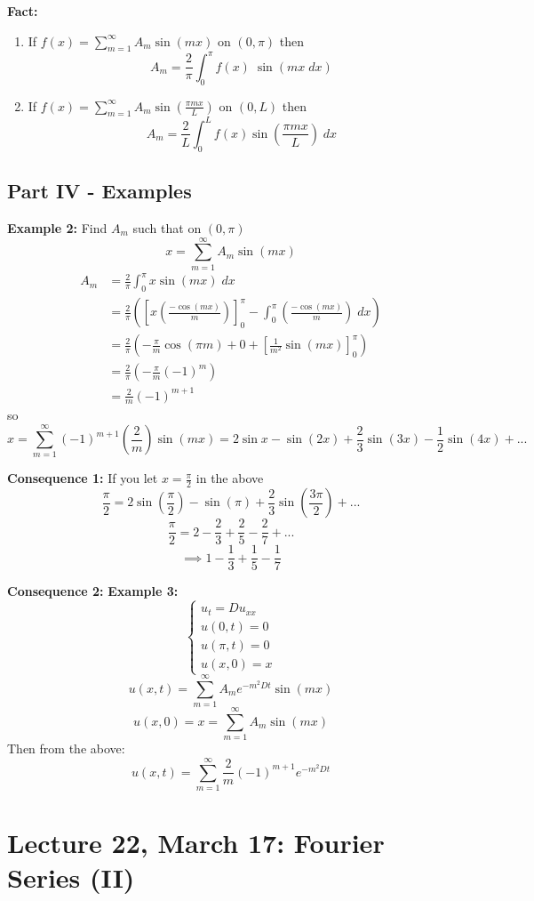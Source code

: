 \documentclass[12pt]{article}
\begin{document}
\textbf{Fact:}
\begin{enumerate}
    \item If $f(x) = \sum_{m=1}^\infty A_m \sin(mx)$ on $(0, \pi)$ then 
    \[A_m = \frac{2}{\pi} \int_0^\pi f(x) \; \sin(mx \; dx)\]
    \item If $f(x) = \sum_{m=1}^\infty A_m \sin(\frac{\pi mx}{L})$ on $(0, L)$ then 
    \[\boxed{A_m = \frac{2}{L} \int_0^L f(x) \sin(\frac{\pi m x}{L})\; dx}\]
\end{enumerate}

\subsection*{Part IV - Examples}
\textbf{Example 2:} Find $A_m$ such that on $(0, \pi)$
\[x = \sum_{m=1}^\infty A_m \sin(mx)\]
\begin{align*}
    A_m &= \frac{2}{\pi} \int_0^\pi x \sin(mx) \; dx\\
    &= \frac{2}{\pi}\left(\left[x (\frac{-\cos(mx)}{m})\right]_0^\pi - \int_0^\pi (\frac{-\cos(mx)}{m}) \; dx\right)\\
    &= \frac{2}{\pi}(-\frac{\pi}{m} \cos(\pi m) + 0 + [\frac{1}{m^2}\sin(mx)]_0^\pi)\\
    &= \frac{2}{\pi}(-\frac{\pi}{m}(-1)^m) \\
    &= \frac{2}{m}(-1)^{m+1}
\end{align*}
so 
\[x= \sum_{m=1}^\infty (-1)^{m+1}\left(\frac{2}{m}\right)\sin(mx) = 2\sin x  -\sin(2x) + \frac{2}{3}\sin(3x) - \frac{1}{2}\sin(4x) + ...\]

\textbf{Consequence 1:} If you let $x = \frac{\pi}{2}$ in the above 
\[\frac{\pi}{2} = 2 \sin(\frac{\pi}{2}) - \sin(\pi) + \frac{2}{3}\sin(\frac{3\pi}{2}) + ...\]
\[\frac{\pi}{2} = 2 - \frac{2}{3} + \frac{2}{5} - \frac{2}{7} + ...\]
\[\implies 1 - \frac{1}{3} + \frac{1}{5} - \frac{1}{7}\]

\textbf{Consequence 2:} 
\textbf{Example 3:} 
\[\begin{cases}
    u_t = Du_{xx}\\
    u(0, t) = 0\\
    u(\pi, t) = 0\\
    u(x, 0) = x
\end{cases}\]
\[u(x, t) = \sum_{m=1}^\infty A_m e^{-m^2Dt}\sin(mx)\]
\[u(x, 0) = x = \sum_{m=1}^\infty A_m \sin(mx)\]
Then from the above:
\[\boxed{u(x, t) = \sum_{m=1}^\infty \frac{2}{m}(-1)^{m+1}e^{-m^2Dt}}\]

\section*{Lecture 22, March 17: Fourier Series (II)}
\end{document}
